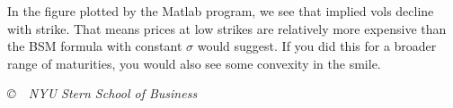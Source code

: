 \documentclass[11pt]{exam}
\begin{document}
\begin{questions}
\begin{solution}
\begin{parts}
In the figure plotted by the Matlab program,
we see that implied vols decline with strike.
That means prices at low strikes are relatively more expensive than the BSM formula
with constant $\sigma$ would suggest.
If you did this for a broader range of maturities,
you would also see some convexity in the smile.


\end{parts}
\end{solution}

\end{questions}

\vfill \centerline{\it \copyright \ \number\year \ NYU Stern School of Business}
\end{document}
